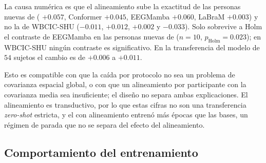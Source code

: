 La causa numérica es que el alineamiento sube la exactitud de las personas nuevas de \openbmi{} (\eegnet{}
$+0.057$, Conformer $+0.045$, EEGMamba $+0.060$, LaBraM $+0.003$) y no la de WBCIC-SHU ($-0.011$, $+0.012$,
$+0.002$ y $-0.033$). Solo sobrevive a Holm el contraste de EEGMamba en las personas nuevas de \openbmi{}
($n = 10$, $p_{\text{Holm}} = 0.023$); en WBCIC-SHU ningún contraste es significativo. En la transferencia del
modelo de $54$ sujetos el cambio es de $+0.006$ a $+0.011$.

\begin{table}[H]
\centering
\caption{Variante con alineamiento euclidiano menos la base de la semilla $2026$, para las cantidades de la
descomposición, con intervalo al $95$\,\% del remuestreo pareado de los mismos participantes en las dos
variantes. Persona nueva: $10$ sujetos apartados; WBCIC-SHU (44): $51$ sujetos.}
\label{tab:ea-caidas}
\footnotesize
{}
\end{table}

Esto es compatible con que la caída por protocolo no sea un problema de covarianza espacial global, o con que
un alineamiento por participante con la covarianza media sea insuficiente; el diseño no separa ambas
explicaciones. El alineamiento es transductivo, por lo que estas cifras no son una transferencia
\textit{zero-shot} estricta, y el \eegnet{} con alineamiento entrenó más épocas que las bases, un régimen de
parada que no se separa del efecto del alineamiento.


\subsection{Comportamiento del entrenamiento}
\label{sec:curvas}

